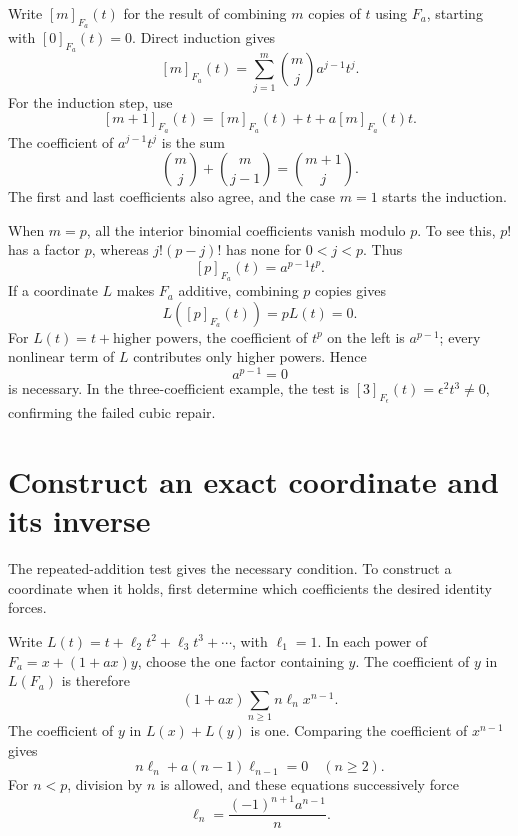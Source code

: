 Write \([m]_{F_a}(t)\) for the result of combining \(m\) copies of \(t\) using \(F_a\), starting with \([0]_{F_a}(t)=0\). Direct induction gives
\begin{equation}\label{eq:m-series}
 [m]_{F_a}(t)=\sum_{j=1}^{m}\binom mj a^{j-1}t^j.
\end{equation}
For the induction step, use
\[
 [m+1]_{F_a}(t)=[m]_{F_a}(t)+t+a[m]_{F_a}(t)t.
\]
The coefficient of \(a^{j-1}t^j\) is the sum
\[
 \binom mj+\binom m{j-1}=\binom{m+1}j.
\]
The first and last coefficients also agree, and the case \(m=1\) starts the induction.

When \(m=p\), all the interior binomial coefficients vanish modulo \(p\). To see this, \(p!\) has a factor \(p\), whereas \(j!(p-j)!\) has none for \(0<j<p\). Thus
\begin{equation}\label{eq:p-series}
 \boxed{\;[p]_{F_a}(t)=a^{p-1}t^p.\;}
\end{equation}
If a coordinate \(L\) makes \(F_a\) additive, combining \(p\) copies gives
\[
 L([p]_{F_a}(t))=pL(t)=0.
\]
For \(L(t)=t+\text{higher powers}\), the coefficient of \(t^p\) on the left is \(a^{p-1}\); every nonlinear term of \(L\) contributes only higher powers. Hence
\begin{equation}\label{eq:necessary}
 a^{p-1}=0
\end{equation}
is necessary. In the three-coefficient example, the test is \([3]_{F_\epsilon}(t)=\epsilon^2t^3\ne0\), confirming the failed cubic repair.

\section{Construct an exact coordinate and its inverse}\label{sec:exact-theorem}

The repeated-addition test gives the necessary condition. To construct a coordinate when it holds, first determine which coefficients the desired identity forces.

Write \(L(t)=t+\ell_2t^2+\ell_3t^3+\cdots\), with \(\ell_1=1\). In each power of \(F_a=x+(1+ax)y\), choose the one factor containing \(y\). The coefficient of \(y\) in \(L(F_a)\) is therefore
\[
 (1+ax)\sum_{n\ge1}n\ell_nx^{n-1}.
\]
The coefficient of \(y\) in \(L(x)+L(y)\) is one. Comparing the coefficient of \(x^{n-1}\) gives
\begin{equation}\label{eq:coefficient-recursion}
 n\ell_n+a(n-1)\ell_{n-1}=0\quad(n\ge2).
\end{equation}
For \(n<p\), division by \(n\) is allowed, and these equations successively force
\[
 \ell_n=\frac{(-1)^{n+1}a^{n-1}}n.
\]

